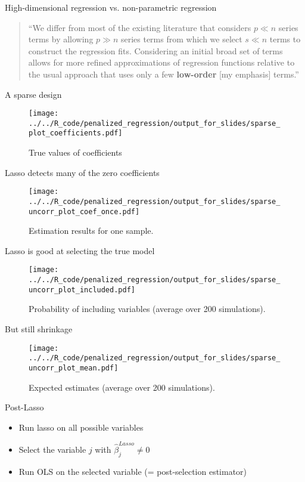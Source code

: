 \documentclass[xcolor=dvipsnames]{beamer}
\begin{document}
\begin{frame}{High-dimensional regression vs. non-parametric regression}
\begin{quote}
  ``We differ from most of the existing literature that considers $p \ll n$ series terms by allowing $p \gg n$ series terms from which we select $s \ll n$ terms to construct the regression fits. Considering an initial broad set of terms allows for more refined approximations of regression functions relative to the usual approach that uses only a few \textbf{low-order} [my emphasis] terms.''\parencite{belloni2014inference}
\end{quote}
\end{frame}


\begin{frame}{A sparse design}
\begin{figure}
  \texttt{[image: ../../R\_code/penalized\_regression/output\_for\_slides/sparse\_plot\_coefficients.pdf]}
   \caption{True values of coefficients}
\end{figure}
\end{frame}

\begin{frame}{Lasso detects many of the zero coefficients}
\begin{figure}
  \texttt{[image: ../../R\_code/penalized\_regression/output\_for\_slides/sparse\_uncorr\_plot\_coef\_once.pdf]}
   \caption{Estimation results for one sample.}
\end{figure}
\end{frame}

\begin{frame}{Lasso is good at selecting the true model}
\begin{figure}
  \texttt{[image: ../../R\_code/penalized\_regression/output\_for\_slides/sparse\_uncorr\_plot\_included.pdf]}
   \caption{Probability of including variables (average over 200 simulations).}
\end{figure}
\end{frame}

\begin{frame}{But still shrinkage}
\begin{figure}
  \texttt{[image: ../../R\_code/penalized\_regression/output\_for\_slides/sparse\_uncorr\_plot\_mean.pdf]}
   \caption{Expected estimates (average over 200 simulations).}
\end{figure}
\end{frame}

\begin{frame}{Post-Lasso}
\begin{itemize}
  \item Run lasso on all possible variables 
  \item Select the variable $j$ with $\hat{\beta}_j^{Lasso} \neq 0$
  \item Run OLS on the selected variable (= post-selection estimator)
\end{itemize}
\end{frame}
\end{document}
